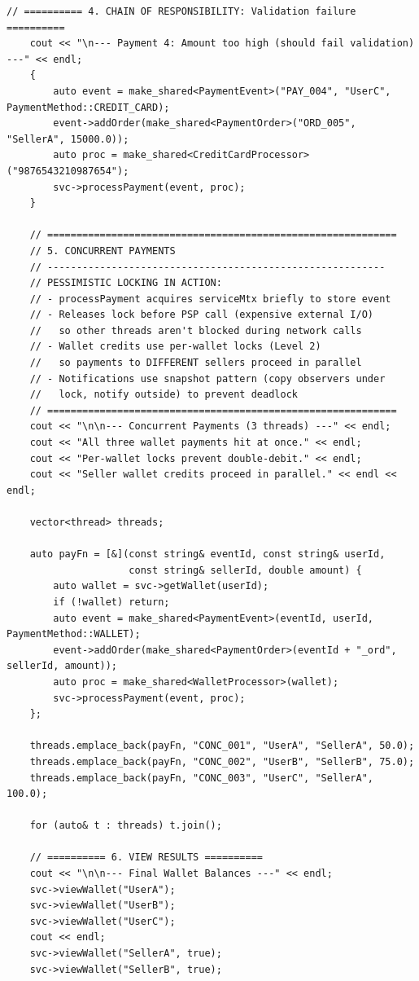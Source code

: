 \documentclass[11pt,a4paper]{article}
\begin{document}
\begin{lstlisting}[title={\texttt{main.cpp}}]
    // ========== 4. CHAIN OF RESPONSIBILITY: Validation failure ==========
    cout << "\n--- Payment 4: Amount too high (should fail validation) ---" << endl;
    {
        auto event = make_shared<PaymentEvent>("PAY_004", "UserC", PaymentMethod::CREDIT_CARD);
        event->addOrder(make_shared<PaymentOrder>("ORD_005", "SellerA", 15000.0));
        auto proc = make_shared<CreditCardProcessor>("9876543210987654");
        svc->processPayment(event, proc);
    }

    // ============================================================
    // 5. CONCURRENT PAYMENTS
    // ----------------------------------------------------------
    // PESSIMISTIC LOCKING IN ACTION:
    // - processPayment acquires serviceMtx briefly to store event
    // - Releases lock before PSP call (expensive external I/O)
    //   so other threads aren't blocked during network calls
    // - Wallet credits use per-wallet locks (Level 2)
    //   so payments to DIFFERENT sellers proceed in parallel
    // - Notifications use snapshot pattern (copy observers under
    //   lock, notify outside) to prevent deadlock
    // ============================================================
    cout << "\n\n--- Concurrent Payments (3 threads) ---" << endl;
    cout << "All three wallet payments hit at once." << endl;
    cout << "Per-wallet locks prevent double-debit." << endl;
    cout << "Seller wallet credits proceed in parallel." << endl << endl;

    vector<thread> threads;

    auto payFn = [&](const string& eventId, const string& userId,
                     const string& sellerId, double amount) {
        auto wallet = svc->getWallet(userId);
        if (!wallet) return;
        auto event = make_shared<PaymentEvent>(eventId, userId, PaymentMethod::WALLET);
        event->addOrder(make_shared<PaymentOrder>(eventId + "_ord", sellerId, amount));
        auto proc = make_shared<WalletProcessor>(wallet);
        svc->processPayment(event, proc);
    };

    threads.emplace_back(payFn, "CONC_001", "UserA", "SellerA", 50.0);
    threads.emplace_back(payFn, "CONC_002", "UserB", "SellerB", 75.0);
    threads.emplace_back(payFn, "CONC_003", "UserC", "SellerA", 100.0);

    for (auto& t : threads) t.join();

    // ========== 6. VIEW RESULTS ==========
    cout << "\n\n--- Final Wallet Balances ---" << endl;
    svc->viewWallet("UserA");
    svc->viewWallet("UserB");
    svc->viewWallet("UserC");
    cout << endl;
    svc->viewWallet("SellerA", true);
    svc->viewWallet("SellerB", true);


\end{lstlisting}
\end{document}
